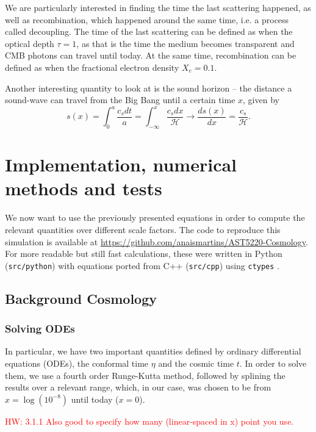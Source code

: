 \documentclass{aa}
\newcommand{\hw}[1]{\textcolor{red}{HW: #1}}
\begin{document}
We are particularly interested in finding the time the last scattering happened, as well as recombination, which happened around the same time, i.e. a process called decoupling. The time of the last scattering can be defined as when the optical depth $\tau=1$, as that is the time the medium becomes transparent and CMB photons can travel until today. At the same time, recombination can be defined as when the fractional electron density $X_e = 0.1$.

Another interesting quantity to look at is the sound horizon -- the distance a sound-wave can travel from the Big Bang until a certain time $x$, given by
\begin{equation}
    s(x) = \int_0^{a} \frac{c_s dt}{a} = \int_{-\infty}^{x} \frac{c_s dx}{\mathcal{H}} \to \frac{ds(x)}{dx} = \frac{c_s}{\mathcal{H}}.
\end{equation}

\section{Implementation, numerical methods and tests}

We now want to use the previously presented equations in order to compute the relevant quantities over different scale factors. The code to reproduce this simulation is available at \url{https://github.com/anaismartins/AST5220-Cosmology}. For more readable but still fast calculations, these were written in Python (\texttt{src/python}) with equations ported from C++ (\texttt{src/cpp}) using \texttt{ctypes} \citep{ctypes}.

\subsection{Background Cosmology}

\subsubsection{Solving ODEs}

In particular, we have two important quantities defined by ordinary differential equations (ODEs), the conformal time $\eta$ and the cosmic time $t$. In order to solve them, we use a fourth order Runge-Kutta method, followed by splining the results over a relevant range, which, in our case, was chosen to be from $x=\log(10^{-8})$ until today ($x=0$).

\hw{3.1.1 Also good to specify how many (linear-spaced in x) point you use.}
\end{document}
